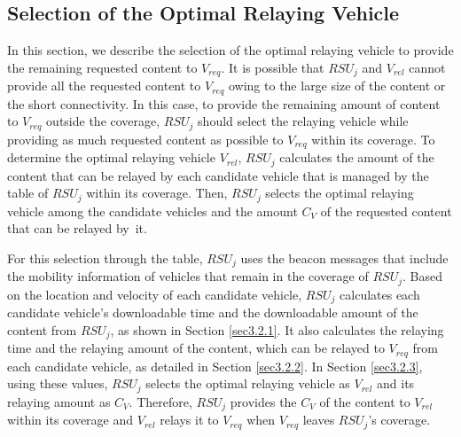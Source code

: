 \documentclass[electronics,aricle,accept,pdftex,moreauthors]{Definitions/mdpi}
\begin{document}
\subsection{Selection of the Optimal Relaying Vehicle} \label{sec3.2}
In this section, we describe the selection of the optimal relaying vehicle to provide the remaining requested content to $V_{req}$.
It is possible that $RSU_{j}$ and $V_{rel}$ cannot provide all the requested content to $V_{req}$ owing to the large size of the content or the short connectivity.
In this case, to provide the remaining amount of content to $V_{req}$ outside the coverage, $RSU_{j}$ should select the relaying vehicle while providing as much requested content as possible to $V_{req}$ within its coverage.
To determine the optimal relaying vehicle $V_{rel}$, $RSU_{j}$ calculates the amount of the content that can be relayed by each candidate vehicle that is managed by the table of $RSU_{j}$ within its coverage.
Then, $RSU_{j}$ selects the optimal relaying vehicle among the candidate vehicles and the amount $C_{V}$ of the requested content that can be relayed by~it.


For this selection through the table, $RSU_{j}$ uses the beacon messages that include the mobility information of vehicles that remain in the coverage of $RSU_{j}$.
Based on the location and velocity of each candidate vehicle, $RSU_{j}$ calculates each candidate vehicle's downloadable time and the downloadable amount of the content from $RSU_{j}$, as shown in Section \ref{sec3.2.1}.
It also calculates the relaying time and the relaying amount of the content, which can be relayed to $V_{req}$ from each candidate vehicle, as detailed in Section \ref{sec3.2.2}.
In Section \ref{sec3.2.3}, using these values, $RSU_{j}$ selects the optimal relaying vehicle as $V_{rel}$ and its relaying amount as $C_{V}$.
Therefore, $RSU_{j}$ provides the $C_{V}$ of the content to $V_{rel}$ within its coverage and $V_{rel}$ relays it to $V_{req}$ when $V_{req}$ leaves $RSU_{j}$'s coverage.
\end{document}
